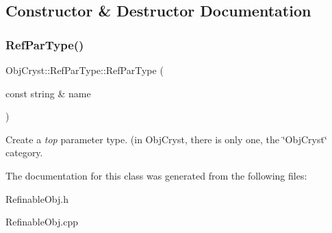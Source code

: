 \subsection{Constructor \& Destructor Documentation}
\mbox{\label{class_obj_cryst_1_1_ref_par_type_a31d4f6797fa0a4b43d12203f89dbdb5c}} 
\subsubsection{\texorpdfstring{RefParType()}{RefParType()}}
{\footnotesize\ttfamily Obj\+Cryst\+::\+Ref\+Par\+Type\+::\+Ref\+Par\+Type (\begin{DoxyParamCaption}\item[{const string \&}]{name }\end{DoxyParamCaption})}

Create a {\itshape top} parameter type. (in Obj\+Cryst, there is only one, the \char`\"{}\+Obj\+Cryst\char`\"{} category. 

The documentation for this class was generated from the following files\+:\begin{DoxyCompactItemize}
\item 
Refinable\+Obj.\+h\item 
Refinable\+Obj.\+cpp\end{DoxyCompactItemize}
